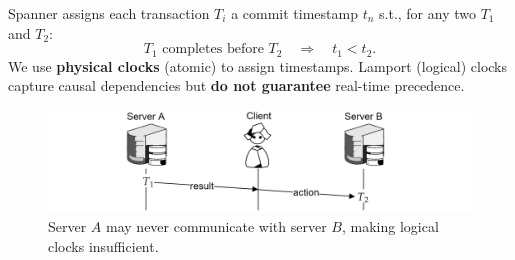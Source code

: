     \begin{Def}
        
        Spanner assigns each transaction \(T_i\) a commit timestamp \(t_n\) s.t., for any two \(T_1\) and \(T_2\):
        \[
        T_1 \text{ completes before } T_2 \quad\Longrightarrow\quad t_1 < t_2.
        \]
        \noindent
        We use \textbf{physical clocks} (atomic) to assign timestamps. Lamport (logical) clocks capture causal dependencies but \textbf{do not guarantee} real-time precedence.
        \end{Def}
    \begin{figure}[ht!]
        \centering
        \includegraphics[width=\textwidth]{Sections/span/tt.png}
        \caption{Server $A$ may never communicate with server $B$, making logical clocks insufficient.}
    \end{figure}
        
